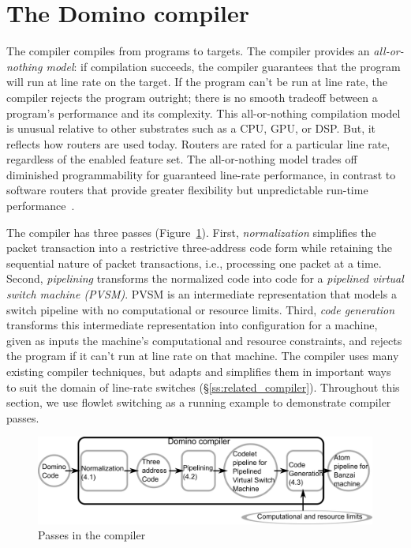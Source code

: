 \section{The Domino compiler}
\label{s:compiler}

The \pktlanguage compiler compiles from \pktlanguage programs to \absmachine
targets. The compiler provides an {\em all-or-nothing model}: if compilation
succeeds, the compiler guarantees that the program will run at line rate on the
target. If the program can't be run at line rate, the compiler rejects the
program outright; there is no smooth tradeoff between a program's performance
and its complexity.  This all-or-nothing compilation model is unusual relative
to other substrates such as a CPU, GPU, or DSP. But, it reflects how routers
are used today. Routers are rated for a particular line rate, regardless of the
enabled feature set. The all-or-nothing model trades off diminished
programmability for guaranteed line-rate performance, in contrast to software
routers that provide greater flexibility but unpredictable run-time
performance~\cite{dobrescu2012, wenfei15}.

The \pktlanguage compiler has three passes (Figure~\ref{fig:passes}).  First,
\textit{normalization} simplifies the packet transaction into a restrictive
three-address code form while retaining the sequential nature of packet
transactions, i.e., processing one packet at a time. Second, \textit{pipelining} transforms the normalized code into
code for a \textit{pipelined virtual switch machine (PVSM)}. PVSM is an
intermediate representation that models a switch pipeline with no computational
or resource limits. Third, \textit{code generation} transforms this
intermediate representation into configuration for a \absmachine machine, given
as inputs the machine's computational and resource constraints, and rejects the
program if it can't run at line rate on that \absmachine machine.  The
\pktlanguage compiler uses many existing compiler techniques, but adapts and
simplifies them in important ways to suit the domain of line-rate switches
(\S\ref{ss:related_compiler}). Throughout this section, we use flowlet
switching as a running example to demonstrate compiler passes.

\begin{figure}[!t]
  \includegraphics[width=\columnwidth]{compiler.pdf}
  \caption{Passes in the \pktlanguage compiler}
  \label{fig:passes}
\end{figure}

